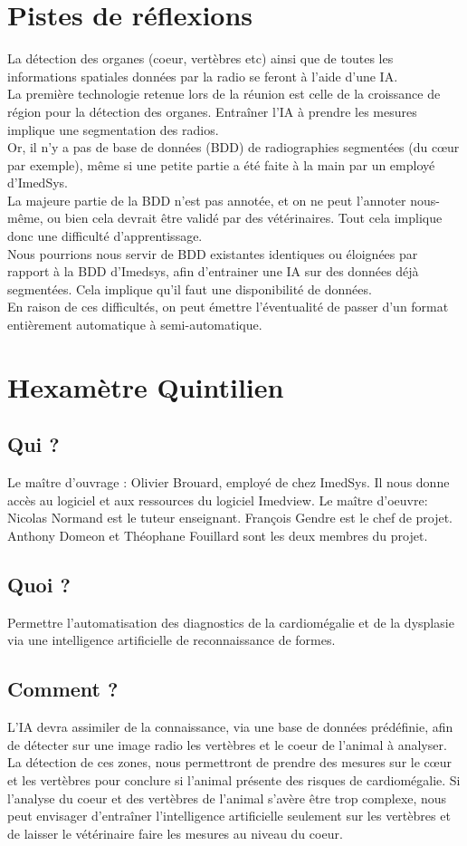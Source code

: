 \documentclass[a4paper, 11pt]{report}
\begin{document}
\section*{Pistes de réflexions}
La détection des organes (coeur, vertèbres etc) ainsi que de toutes les informations spatiales données par la radio se feront à l'aide d'une IA.\\
La première technologie retenue lors de la réunion est celle de la croissance de région pour la détection des organes.
Entraîner l'IA à prendre les mesures implique une segmentation des radios.\\
Or, il n'y a pas de base de données (BDD) de radiographies segmentées (du c\oe{}ur par exemple), même si une petite partie a été faite à la main par un employé d'ImedSys.\\
La majeure partie de la BDD n'est pas annotée, et on ne peut l'annoter nous-même, ou bien cela devrait être validé par des vétérinaires. Tout cela implique donc une difficulté d'apprentissage.\\
Nous pourrions nous servir de BDD existantes identiques ou éloignées par rapport à la BDD d'Imedsys, afin d'entrainer une IA sur des données déjà segmentées.
Cela implique qu'il faut une disponibilité de données.\\
En raison de ces difficultés, on peut émettre l'éventualité de passer d'un format entièrement automatique à semi-automatique.

\section*{Hexamètre Quintilien}
\subsection*{Qui ?} 
Le maître d’ouvrage : Olivier Brouard, employé de chez ImedSys.
Il nous donne accès au logiciel et aux ressources du logiciel Imedview.
Le maître d’oeuvre: Nicolas Normand est le tuteur enseignant.
François Gendre est le chef de projet.
Anthony Domeon et Théophane Fouillard sont les deux membres du projet.

\subsection*{Quoi ?}
Permettre l’automatisation des diagnostics de la cardiomégalie et de la dysplasie via une intelligence artificielle de reconnaissance de formes.

\subsection*{Comment ?}
L’IA devra assimiler de la connaissance, via une base de données prédéfinie, afin de détecter sur une image radio les vertèbres et le coeur de l’animal à analyser. La détection de ces zones, nous permettront de prendre des mesures sur le c\oe{}ur et les vertèbres pour conclure si l’animal présente des risques de cardiomégalie.
Si l’analyse du coeur et des vertèbres de l’animal s'avère être trop complexe, nous peut envisager d'entraîner l'intelligence artificielle seulement sur les vertèbres et de laisser le vétérinaire faire les mesures au niveau du coeur.
\end{document}
